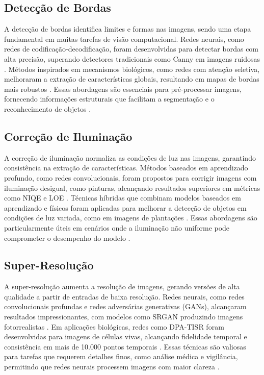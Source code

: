 \subsection{Detecção de Bordas}
A detecção de bordas identifica limites e formas nas imagens, sendo uma etapa fundamental em muitas tarefas de visão computacional. Redes neurais, como redes de codificação-decodificação, foram desenvolvidas para detectar bordas com alta precisão, superando detectores tradicionais como Canny em imagens ruidosas \cite{yu1994edge}. Métodos inspirados em mecanismos biológicos, como redes com atenção seletiva, melhoraram a extração de características globais, resultando em mapas de bordas mais robustos \cite{chen2022edge}. Essas abordagens são essenciais para pré-processar imagens, fornecendo informações estruturais que facilitam a segmentação e o reconhecimento de objetos \cite{yu1994edge}.

\subsection{Correção de Iluminação}
A correção de iluminação normaliza as condições de luz nas imagens, garantindo consistência na extração de características. Métodos baseados em aprendizado profundo, como redes convolucionais, foram propostos para corrigir imagens com iluminação desigual, como pinturas, alcançando resultados superiores em métricas como NIQE e LOE \cite{li2020simple}. Técnicas híbridas que combinam modelos baseados em aprendizado e físicos foram aplicadas para melhorar a detecção de objetos em condições de luz variada, como em imagens de plantações \cite{yang2022using}. Essas abordagens são particularmente úteis em cenários onde a iluminação não uniforme pode comprometer o desempenho do modelo \cite{li2020simple}.

\subsection{Super-Resolução}
A super-resolução aumenta a resolução de imagens, gerando versões de alta qualidade a partir de entradas de baixa resolução. Redes neurais, como redes convolucionais profundas e redes adversárias generativas (GANs), alcançaram resultados impressionantes, com modelos como SRGAN produzindo imagens fotorrealistas \cite{ledig2017photo}. Em aplicações biológicas, redes como DPA-TISR foram desenvolvidas para imagens de células vivas, alcançando fidelidade temporal e consistência em mais de 10.000 pontos temporais \cite{liu2025neural}. Essas técnicas são valiosas para tarefas que requerem detalhes finos, como análise médica e vigilância, permitindo que redes neurais processem imagens com maior clareza \cite{ledig2017photo}.

